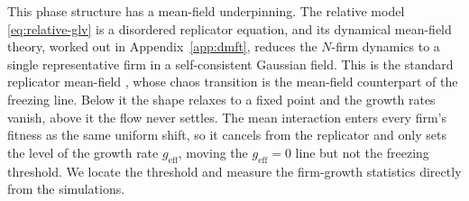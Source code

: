 This phase structure has a mean-field underpinning. The relative model
\eqref{eq:relative-glv} is a disordered replicator equation, and its dynamical mean-field theory,
worked out in Appendix~\ref{app:dmft}, reduces the $N$-firm dynamics to a single representative
firm in a self-consistent Gaussian field. This is the standard replicator mean-field
\citep{galla2018,roy2020}, whose chaos transition is the mean-field counterpart of the freezing
line. Below it the shape relaxes to a fixed point and the growth rates vanish, above it the flow
never settles. The mean interaction enters every firm's fitness as the same uniform shift, so it
cancels from the replicator and only sets the level of the growth rate $g_{\mathrm{eff}}$, moving
the $g_{\mathrm{eff}} = 0$ line but not the freezing threshold. We locate the threshold and
measure the firm-growth statistics directly from the simulations.
